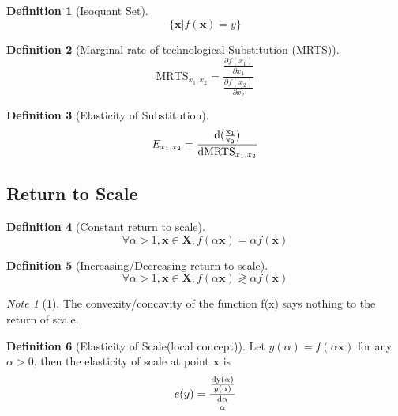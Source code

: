 \documentclass{book}
\theoremstyle{plain}
\theoremstyle{definition}
\newtheorem{defn}{Definition}[section]
\theoremstyle{remark}
\newtheorem*{note}{Note}
\begin{document}
\begin{defn}[Isoquant Set]
\begin{equation}
	\{ \bm{x}|f(\bm{x}) = y \}
\end{equation}
\end{defn}

\begin{defn}[Marginal rate of technological Substitution (MRTS)]
\begin{equation}
	\text{MRTS}_{x_1,x_2}=\frac{\frac{\partial f(x_1)}{\partial x_1}}{\frac{\partial f(x_2)}{\partial x_2}}
\end{equation}
\end{defn}

\begin{defn}[Elasticity of Substitution]
\begin{equation}
	E_{x_1,x_2}= \frac{\rm{d}(\frac{x_1}{x_2})}{{\rm d} \text{MRTS}_{x_1,x_2}}	
\end{equation}
\end{defn}

\subsection{Return to Scale}
\begin{defn}[Constant return to scale]
\begin{equation}
	\forall \alpha >1, \bm{x}\in \bm{X}, f(\alpha \bm{x})= \alpha f(\bm{x})
\end{equation}
\end{defn}

\begin{defn}[Increasing/Decreasing return to scale]
\begin{equation}
	\forall \alpha >1, \bm{x}\in \bm{X}, f(\alpha \bm{x})\gtrless \alpha f(\bm{x})
\end{equation}
\end{defn}

\begin{note}[1]
	The convexity/concavity of the function f(x) says nothing to the return of scale.
\end{note}

\begin{defn}[Elasticity of Scale(local concept)]
	Let $y(\alpha) = f(\alpha \bm{x})$ for any $\alpha > 0$, then the elasticity of scale at point $\bm{x}$ is  
	\begin{equation}
		e(y) = \frac{\frac{\rm{d} y(\alpha)}{y(\alpha)}}{\frac{\rm{d} \alpha}{ \alpha}}
	\end{equation}
\end{defn}
\end{document}
